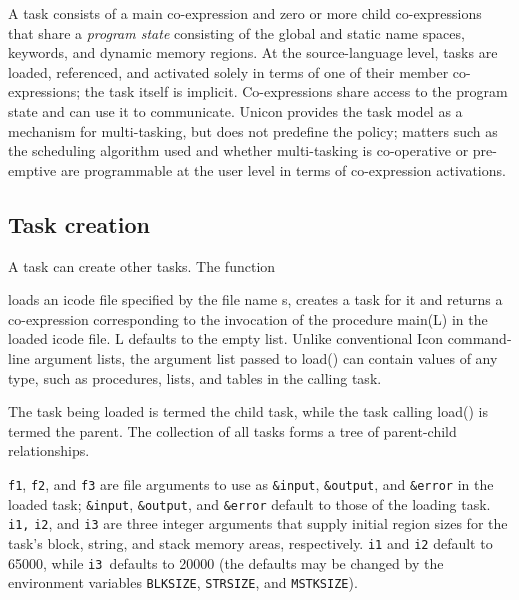 A task consists of a main co-expression and zero or more child
co-expressions that share a {\em program state\/} 
consisting of the global and static name
spaces, keywords, and dynamic memory regions. At the source-language
level, tasks are loaded, referenced, and activated solely in terms of
one of their member co-expressions; the task itself is implicit.
Co-expressions share access to the program state and can use it to
communicate.
Unicon provides the task model as a mechanism for multi-tasking, but does
not predefine the policy; matters such as the scheduling algorithm used and
whether multi-tasking is co-operative or pre-emptive are programmable at the
user level in terms of co-expression activations.


\subsection{Task creation}

A task can create other tasks. The function 


\noindent loads an icode file \cite{Gris86} specified by the file name
\textrm{s}, creates a task for it and returns a co-expression corresponding to
the invocation of the procedure {\textrm{main(L)}} in the
loaded icode file.  {\textrm{L}}{
}defaults to the empty list. Unlike conventional Icon command-line argument
lists, the argument list passed to{
}{\textrm{load()}} can contain values of any type, such as
procedures, lists, and tables in the calling task.

The task being loaded is termed the child task, while the task calling
{\textrm{load()}} is termed the parent. The
collection of all tasks forms a tree of parent-child
relationships.

{\texttt{f1}}, {\texttt{f2}},
and {\texttt{f3}}{ }are file
arguments to use as {\texttt{\&input}},
{\texttt{\&output}}, and
{\texttt{\&error}} in the loaded task;
{\texttt{\&input}},
{\texttt{\&output}}, and
{\texttt{\&error}}{\textrm{
}}default to those of the loading task.{\textrm{
}}{\texttt{i1,}} {\texttt{i2}},
and {\texttt{i3}} are three integer arguments that
supply initial region sizes for the task's block,
string, and stack memory areas, respectively.
{\texttt{i1}} and {\texttt{i2}}
default to 65000, while {\texttt{i3 }}defaults to
20000 (the defaults may be changed by the environment variables
{\texttt{BLKSIZE}},
{\texttt{STRSIZ}}\texttt{E}, and
{\texttt{MSTKSIZE}}). 


